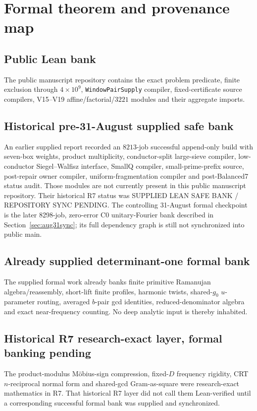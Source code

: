 \documentclass[11pt]{article}
\theoremstyle{definition}
\newcommand{\1}{\mathbf 1}
\newcommand{\status}[1]{\textsf{#1}}
\begin{document}
\section{Formal theorem and provenance map}

\subsection*{Public Lean bank}
The public manuscript repository contains the exact problem predicate, finite exclusion
through $4\times10^9$, \texttt{WindowPairSupply} compiler, fixed-certificate source
compilers, V15--V19 affine/factorial/$3221$ modules and their aggregate imports.

\subsection*{Historical pre-31-August supplied safe bank}
An earlier supplied report recorded an $8213$-job successful append-only build with
seven-box weights, product multiplicity, conductor-split large-sieve compiler,
low-conductor Siegel--Walfisz interface, SmallQ compiler, small-prime-prefix source,
post-repair owner compiler, uniform-fragmentation compiler and post-Balanced7 status audit.
Those modules are not currently present in this public manuscript repository.  Their historical R7
status was \status{SUPPLIED LEAN SAFE BANK / REPOSITORY SYNC PENDING}.  The controlling 31-August formal checkpoint is the later 8298-job, zero-error C0 unitary-Fourier bank described in Section~\ref{sec:aug31sync}; its full dependency graph is still not synchronized into public main.

\subsection*{Already supplied determinant-one formal bank}
The supplied formal work already banks finite primitive Ramanujan algebra/reassembly,
short-lift finite profiles, harmonic twists, shared-$g_0$ $u$-parameter routing, averaged
$b$-pair gcd identities, reduced-denominator algebra and exact near-frequency counting.
No deep analytic input is thereby inhabited.

\subsection*{Historical R7 research-exact layer, formal banking pending}
The product-modulus M\"obius-sign compression, fixed-$D$ frequency rigidity, CRT
$n$-reciprocal normal form and shared-gcd Gram-as-square were research-exact mathematics in R7.
That historical R7 layer did not call them Lean-verified until a corresponding successful formal
bank was supplied and synchronized.
\end{document}
